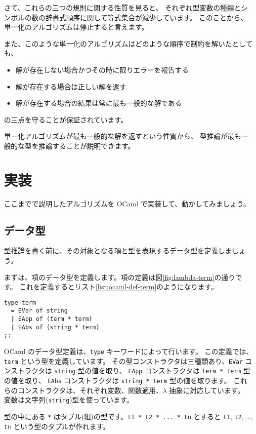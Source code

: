さて、これらの三つの規則に関する性質を見ると、
それぞれ型変数の種類とシンボルの数の辞書式順序に関して等式集合が減少しています。
このことから、単一化のアルゴリズムは停止すると言えます。

また、このような単一化のアルゴリズムはどのような順序で制約を解いたとしても、
\begin{itemize}
  \item 解が存在しない場合かつその時に限りエラーを報告する
  \item 解が存在する場合は正しい解を返す
  \item 解が存在する場合の結果は常に最も一般的な解である
\end{itemize}
の三点を守ることが保証されています。

単一化アルゴリズムが最も一般的な解を返すという性質から、
型推論が最も一般的な型を推論することが説明できます。

\section{実装}

ここまでで説明したアルゴリズムを OCaml で実装して、動かしてみましょう。

\subsection{データ型}

型推論を書く前に、その対象となる項と型を表現するデータ型を定義しましょう。

まずは、項のデータ型を定義します。項の定義は図\ref{fig:lambda-term}の通りです。
これを定義するとリスト\ref{list:ocaml-def-term}のようになります。

\begin{lstlisting}[caption=項の定義, label=list:ocaml-def-term]
type term
  = EVar of string
  | EApp of (term * term)
  | EAbs of (string * term)
;;
\end{lstlisting}

OCaml のデータ型定義は、\texttt{type} キーワードによって行います。
この定義では、\texttt{term} という型を定義しています。
その型コンストラクタは三種類あり、\texttt{EVar} コンストラクタは \texttt{string} 型の値を取り、
\texttt{EApp} コンストラクタは \texttt{term * term} 型の値を取り、
\texttt{EAbs} コンストラクタは \texttt{string * term} 型の値を取ります。
これらのコンストラクタは、それぞれ変数、関数適用、$\lambda$ 抽象に対応しています。
変数は文字列(\texttt{string})型を使っています。

型の中にある \texttt{*} はタプル(組)の型です。\texttt{t1 * t2 * ... * tn} とすると
\texttt{t1}, \texttt{t2}, \dots, \texttt{tn} という型のタプルが作れます。

